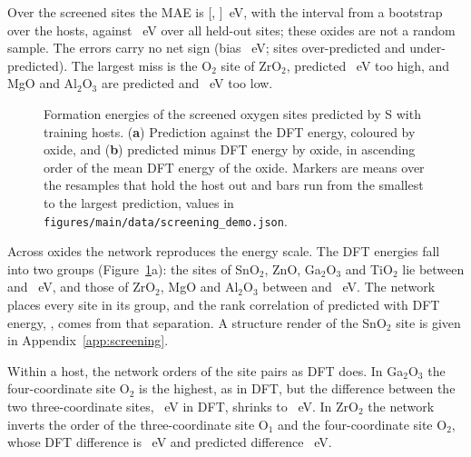 Over the \numNetScreenSites{} screened sites the MAE is \numNetScreenMae{} [\numNetScreenMaeLo{}, \numNetScreenMaeHi{}]~eV, with the interval from a bootstrap over the \numNetScreenHosts{} hosts, against \numNetSixHundredFiftyFourMaeS{}~eV over all held-out sites; these oxides are not a random sample. The errors carry no net sign (bias \numNetScreenBias{}~eV; \numNetScreenOver{} sites over-predicted and \numNetScreenUnder{} under-predicted). The largest miss is the O$_2$ site of ZrO$_2$, predicted \numNetScreenZrOTwoOTwoErr{}~eV too high, and MgO and Al$_2$O$_3$ are predicted \numNetScreenMgOOOneAbsErr{} and \numNetScreenAlTwoOThreeOOneAbsErr{}~eV too low.

\begin{figure}[H]
\centering
{}
\caption{Formation energies of the screened oxygen sites predicted by S with \numNetScreenBudget{} training hosts. (\textbf{a}) Prediction against the DFT energy, coloured by oxide, and (\textbf{b}) predicted minus DFT energy by oxide, in ascending order of the mean DFT energy of the oxide. Markers are means over the resamples that hold the host out and bars run from the smallest to the largest prediction, values in \texttt{figures/main/data/screening\_demo.json}.\label{fig:screening}}
\end{figure}

Across oxides the network reproduces the energy scale. The DFT energies fall into two groups (Figure~\ref{fig:screening}a): the sites of SnO$_2$, ZnO, Ga$_2$O$_3$ and TiO$_2$ lie between \numNetScreenGaTwoOThreeOOneDft{} and \numNetScreenTiOTwoOFourDft{}~eV, and those of ZrO$_2$, MgO and Al$_2$O$_3$ between \numNetScreenZrOTwoOTwoDft{} and \numNetScreenAlTwoOThreeOOneDft{}~eV. The network places every site in its group, and the rank correlation of predicted with DFT energy, \numNetScreenSpearman{}, comes from that separation. A structure render of the SnO$_2$ site is given in Appendix~\ref{app:screening}.

Within a host, the network orders \numNetScreenPairsConcordant{} of the \numNetScreenPairs{} site pairs as DFT does. In Ga$_2$O$_3$ the four-coordinate site O$_2$ is the highest, as in DFT, but the difference between the two three-coordinate sites, \numScreeningDemoPairsGaTwoOThreeOOneOThreeDftDiffEV{}~eV in DFT, shrinks to \numScreeningDemoPairsGaTwoOThreeOOneOThreeVTwoDiffEV{}~eV. In ZrO$_2$ the network inverts the order of the three-coordinate site O$_1$ and the four-coordinate site O$_2$, whose DFT difference is \numScreeningDemoPairsZrOTwoOOneOTwoDftDiffEV{}~eV and predicted difference \numScreeningDemoPairsZrOTwoOOneOTwoVTwoDiffEV{}~eV.
